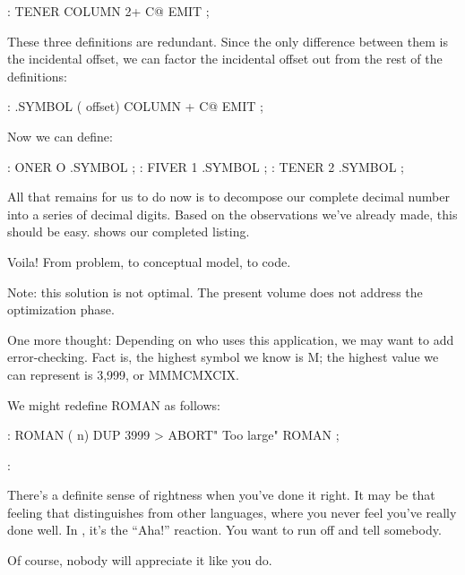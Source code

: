 \begin{Code}
: TENER  COLUMN 2+    C@ EMIT ;
\end{Code}
These three definitions are redundant. Since the only difference between
them is the incidental offset, we can factor the incidental offset out
from the rest of the definitions:

\begin{Code}
: .SYMBOL  ( offset)  COLUMN +  C@ EMIT ;
\end{Code}
Now we can define:

\begin{Code}
: ONER    O .SYMBOL ;
: FIVER   1 .SYMBOL ;
: TENER   2 .SYMBOL ;
\end{Code}
All that remains for us to do now is to decompose our complete decimal
number into a series of decimal digits. Based on the observations we've
already made, this should be easy.  shows our completed
listing.

Voila! From problem, to conceptual model, to code.

Note: this solution is not optimal. The present volume does not address
the optimization phase.

One more thought: Depending on who uses this application, we may
want to add error-checking. Fact is, the highest symbol we know is M; the
highest value we can represent is 3,999, or MMMCMXCIX.

\goodbreak
We might redefine ROMAN as follows:

\begin{Code}
: ROMAN  ( n)
   DUP  3999 >  ABORT" Too large"  ROMAN ;
\end{Code}

\begin{interview}
:

\begin{tfquot}
There's a definite sense of rightness when you've done it right. It may be
that feeling that distinguishes \Forth{} from other languages, where you
never feel you've really done well. In \Forth{}, it's the ``Aha!''
reaction. You want to run off and tell somebody.

Of course, nobody will appreciate it like you do.
\end{tfquot}
\end{interview}

